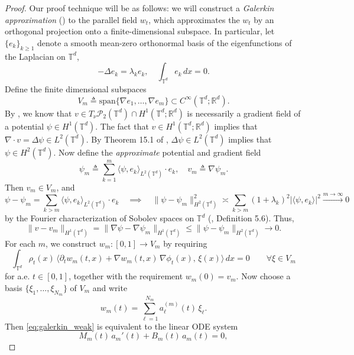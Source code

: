 \documentclass[11pt]{article}
\begin{document}
\begin{proof}
    Our proof technique will be as follows: we will construct a \textit{Galerkin approximation} (\citet[\S 7.1.2]{evans2022partial}) to the parallel field $w_t$, which approximates the $w_t$ by an orthogonal projection onto a finite-dimensional subspace. In particular, let $\{e_k\}_{k \geq 1}$ denote a smooth mean-zero orthonormal basis of the eigenfunctions of the Laplacian on $\mathbb{T}^d$,
    \[-\Delta e_k = \lambda_ke_k, \quad \int_{\mathbb{T}^d}e_k \, dx = 0. \]
    Define the finite dimensional subspaces
    \[V_m \triangleq \text{span}\{\nabla e_1, \dots, \nabla e_m\} \subset C^\infty(\mathbb{T}^d; \mathbb{R}^d).\]
    By , we know that $v \in T_\nu \mathcal{P}_2(\mathbb{T}^d) \cap H^1(\mathbb{T}^d;\mathbb{R}^d)$ is necessarily a gradient field of a potential $\psi \in H^1(\mathbb{T}^d)$. The fact that $v \in H^1(\mathbb{T}^d; \mathbb{R}^d)$ implies that $\nabla \cdot v = \Delta \psi \in L^2(\mathbb{T}^d).$ By Theorem 15.1 of \citet{dyatlov2022ellipticnotes}, $\Delta \psi \in L^2(\mathbb{T}^d)$ implies that $\psi \in H^2(\mathbb{T}^d)$. Now define the \textit{approximate} potential and gradient field
    \[\psi_m \triangleq \sum_{k = 1}^m \langle \psi, e_k\rangle_{L^2(\mathbb{T}^d)} \cdot e_k, \quad v_m\triangleq \nabla \psi_m.\]
    Then $v_m \in V_m$, and 
    \[ \psi - \psi_m = \sum_{k > m}\langle \psi, e_k\rangle_{L^2(\mathbb{T}^d)} \cdot e_k \quad \implies \quad\|\psi - \psi_m\|_{H^2(\mathbb{T}^d)}^2 \asymp \sum_{k > m}(1 + \lambda_k)^2|\langle \psi, e_k \rangle |^2 \overset{m \rightarrow \infty}\longrightarrow 0 \]
    by the Fourier characterization of Sobolev spaces on $\mathbb{T}^d$ (\citet{shkoller2009lp_sobolev_notes}, Definition 5.6). Thus,
    \[\|v - v_m\|_{H^1(\mathbb{T}^d)}  = \|\nabla \psi - \nabla \psi_m\|_{H^1(\mathbb{T}^d)} \leq \| \psi -  \psi_m\|_{H^2(\mathbb{T}^d)} \rightarrow 0.\]
    For each $m$, we construct $w_m:[0,1]\to V_m$ by requiring
    \begin{equation}
    \int_{\mathbb T^d}
    \rho_t(x)\,
    \big\langle \partial_t w_m(t,x)+\nabla w_m(t,x)\,\nabla\phi_t(x),\,\xi(x)\big\rangle\,dx
    =0
    \qquad\forall \xi\in V_m
    \label{eq:galerkin_weak}
    \end{equation}
    for a.e. $t\in[0,1]$, together with the requirement $w_m(0)=v_m.$ Now choose a basis $\{\xi_1,\dots,\xi_{N_m}\}$ of $V_m$ and write
    \[
    w_m(t)=\sum_{\ell=1}^{N_m} a_\ell^{(m)}(t)\,\xi_\ell.
    \]
    Then \cref{eq:galerkin_weak} is equivalent to the linear ODE system
    \[
    M_m(t)\,a_m'(t)+B_m(t)\,a_m(t)=0,
\]
\end{proof}
\end{document}
